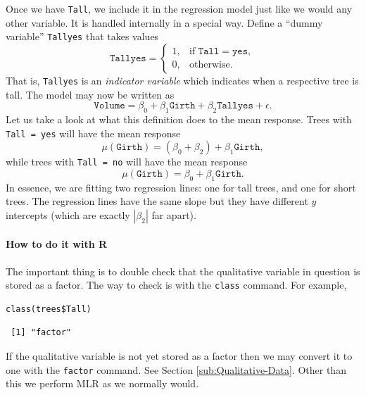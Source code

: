 \documentclass[captions=tableheading]{scrbook}
\begin{document}
Once we have \texttt{Tall}, we include it in the regression model just like we would any other variable. It is handled internally in a special way. Define a ``dummy variable'' \texttt{Tallyes} that takes values
\begin{equation}
\mathtt{Tallyes}=
\begin{cases}
1, & \mbox{if }\mathtt{Tall}=\mathtt{yes},\\
0, & \mbox{otherwise.}
\end{cases}
\end{equation}
That is, \texttt{Tallyes} is an \emph{indicator variable} which indicates when a respective tree is tall. The model may now be written as 
\begin{equation}
\mathtt{Volume}=\beta_{0}+\beta_{1}\mathtt{Girth}+\beta_{2}\mathtt{Tallyes}+\epsilon.
\end{equation}
Let us take a look at what this definition does to the mean response. Trees with \texttt{Tall = yes} will have the mean response
\begin{equation}
\mu(\mathtt{Girth})=(\beta_{0}+\beta_{2})+\beta_{1}\mathtt{Girth},
\end{equation}
while trees with \texttt{Tall = no} will have the mean response
\begin{equation} 
\mu(\mathtt{Girth})=\beta_{0}+\beta_{1}\mathtt{Girth}.
\end{equation}
In essence, we are fitting two regression lines: one for tall trees, and one for short trees. The regression lines have the same slope but they have different $y$ intercepts (which are exactly $|\beta_{2}|$ far apart).

\paragraph*{How to do it with \textsf{R}}

The important thing is to double check that the qualitative variable in question is stored as a factor. The way to check is with the \texttt{class} command. For example,


\begin{verbatim}
class(trees$Tall)
\end{verbatim}

\begin{verbatim}
 [1] "factor"
\end{verbatim}

If the qualitative variable is not yet stored as a factor then we may convert it to one with the \texttt{factor} command. See Section \ref{sub:Qualitative-Data}. Other than this we perform MLR as we normally would.
\end{document}
